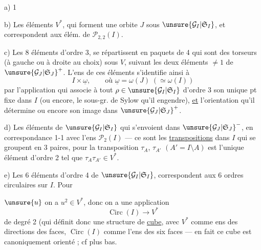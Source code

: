 a) 1

b) Les  éléments  $V^*$,
qui forment une orbite $J$ sous $\unsure{\mathcal{G}_I|\mathfrak{S}_I}$, et correspondent
aux élém. de $\mathcal{P}_{2,2}(I)$.

c) Les  8 éléments d'ordre 3, se répartissent en
  paquets de 4 qui sont des torseurs
(à gauche ou à droite au choix) sous $V$, suivant les deux éléments
$\ne1$ de $\unsure{\mathcal{G}_J|\mathfrak{S}_J}^+$.
L'ens de ces éléments s'identifie ainsi à
\[
 I\times\underline{\omega},\qquad
 \text{où }\underline{\omega}=\omega(J)\;(\simeq\omega(I))
\]
par l'application qui associe à tout
$\rho\in\unsure{\mathcal{G}_I|\mathfrak{S}_I}$ d'ordre 3 son unique pt fixe dans $I$
(ou encore, le sous-gr. de Sylow qu'il engendre), \uline{et} l'orientation
qu'il détermine  ou encore son image dans
$\unsure{\mathcal{G}_J|\mathfrak{S}_J}^+$.

d) Les  éléments
 de $\unsure{\mathcal{G}_I|\mathfrak{S}_I}$
qui s'envoient dans $\unsure{\mathcal{G}_J|\mathfrak{S}_J}^-$, en correspondance 1-1
avec l'ens $\mathcal{P}_2(I)$ --- ce sont les \uline{transpositions} dans $I$
qui se groupent en 3  paires, pour la transposition
$\tau_A$, $\tau_{A'}$  $(A'=I\setminus A)$ est l'unique
 élément d'ordre 2 tel que $\tau_A\tau_{A'}\in V^*$.

e) Les 6 éléments d'ordre 4 de $\unsure{\mathcal{G}_I|\mathfrak{S}_I}$, correspondent aux
6 ordres circulaires sur $I$. Pour

$\unsure{u}$  on a $u^2\in V^*$, donc on a une application
\[
 \operatorname{Circ}(I)\longrightarrow V^*
\]
de degré 2 (qui définit donc une structure de \uline{cube}, avec $V^*$ comme
ens des directions des faces, $\operatorname{Circ}(I)$ comme l'ens des six faces
--- en fait ce cube est canoniquement orienté ; cf plus bas.


